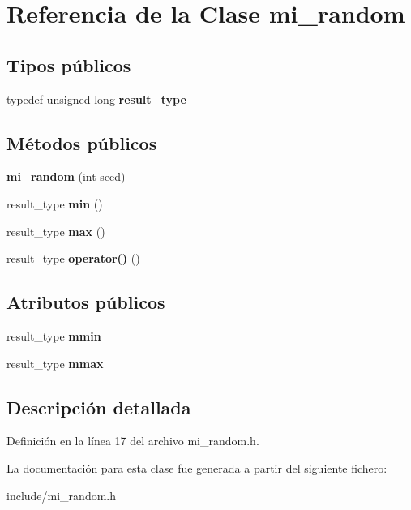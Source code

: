 \hypertarget{classmi__random}{}\section{Referencia de la Clase mi\+\_\+random}
\label{classmi__random}
\subsection*{Tipos públicos}
\begin{DoxyCompactItemize}
\item 
\mbox{\label{classmi__random_a6aea707ebdebf4c974b66185d72d4a1c}} 
typedef unsigned long {\bfseries result\+\_\+type}
\end{DoxyCompactItemize}
\subsection*{Métodos públicos}
\begin{DoxyCompactItemize}
\item 
\mbox{\label{classmi__random_ab570501afcf32838a6a7d37a36e542ce}} 
{\bfseries mi\+\_\+random} (int seed)
\item 
\mbox{\label{classmi__random_ad5424670d2a746b4712e16ed33e2f1eb}} 
result\+\_\+type {\bfseries min} ()
\item 
\mbox{\label{classmi__random_a93a965b26278493733341309a81d654b}} 
result\+\_\+type {\bfseries max} ()
\item 
\mbox{\label{classmi__random_ad65d42c8086c561fbe7e9a392295345d}} 
result\+\_\+type {\bfseries operator()} ()
\end{DoxyCompactItemize}
\subsection*{Atributos públicos}
\begin{DoxyCompactItemize}
\item 
\mbox{\label{classmi__random_ae98232ccc182fa396e63843c3a5aa739}} 
result\+\_\+type {\bfseries mmin}
\item 
\mbox{\label{classmi__random_a8f5e124381a63054923d5c7bd7253058}} 
result\+\_\+type {\bfseries mmax}
\end{DoxyCompactItemize}


\subsection{Descripción detallada}


Definición en la línea 17 del archivo mi\+\_\+random.\+h.



La documentación para esta clase fue generada a partir del siguiente fichero\+:\begin{DoxyCompactItemize}
\item 
include/mi\+\_\+random.\+h\end{DoxyCompactItemize}

